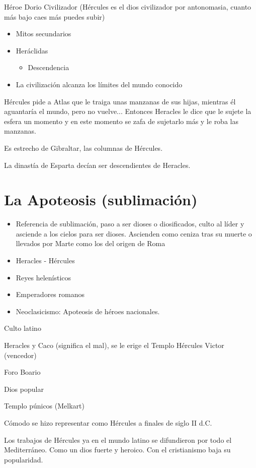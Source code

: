 Héroe Dorio Civilizador (Hércules es el dios civilizador por antonomasia, cuanto más bajo caes más puedes subir)
\begin{itemize}
	\item Mitos secundarios
	\item Heráclidas
	      \begin{itemize}
		      \item Descendencia
	      \end{itemize}
	\item La civilización alcanza  los límites del mundo conocido
\end{itemize}

Hércules pide a Atlas que le traiga unas manzanas de sus hijas, mientras él aguantaría el mundo, pero no vuelve... Entonces Heracles le dice que le sujete la esfera un momento y en este momento se zafa de sujetarlo más y le roba las manzanas.

Es estrecho de Gibraltar, las columnas de Hércules.

La dinastía de Esparta decían ser descendientes de Heracles.

\section{La Apoteosis (sublimación)}
\begin{itemize}
	\item Referencia de sublimación, paso a ser dioses o diosificados, culto al líder y asciende a los cielos para ser dioses. Ascienden como ceniza tras su muerte o llevados por Marte como los del origen de Roma
	\item Heracles - Hércules
	\item Reyes helenísticos
	\item Emperadores romanos
	\item Neoclasicismo: Apoteosis de héroes nacionales.
\end{itemize}

Culto latino

Heracles y Caco (significa el mal), se le erige el Templo Hércules Victor (vencedor)

Foro Boario

Dios popular

Templo púnicos (Melkart)

Cómodo se hizo representar como Hércules a finales de siglo II d.C.

Los trabajos de Hércules ya en el mundo latino se difundieron por todo el Mediterráneo. Como un dios fuerte y heroico. Con el cristianismo baja su popularidad.

